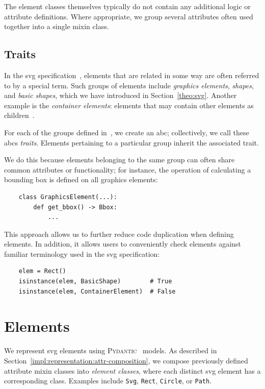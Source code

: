 The element classes themselves typically do not contain any additional logic or attribute definitions. Where appropriate, we group several attributes often used together into a single mixin class.

\subsection{Traits}

In the \gls{svg} specification~\cite{svg11}, elements that are related in some way are often referred to by a special term. Such groups of elements include \emph{graphics elements}, \emph{shapes}, and \emph{basic shapes}, which we have introduced in Section~\ref{theo:svg}. Another example is the \emph{container elements}: elements that may contain other elements as children~\cite[Sec.~1.6]{svg11}. 

For each of the groups defined in~\cite[Sec.~1.6]{svg11}, we create an \gls{abc}; collectively, we call these \glspl{abc} \emph{traits}. Elements pertaining to a particular group inherit the associated trait.

\begin{samepage}
We do this because elements belonging to the same group can often share common attributes or functionality; for instance, the operation of calculating a bounding box is defined on all graphics elements:
\begin{verbatim}
    class GraphicsElement(...):
        def get_bbox() -> Bbox:
            ...
\end{verbatim}
\end{samepage}

\begin{samepage}
This approach allows us to further reduce code duplication when defining elements. In addition, it allows users to conveniently check elements against familiar terminology used in the \gls{svg} specification:
\begin{verbatim}
    elem = Rect()
    isinstance(elem, BasicShape)        # True
    isinstance(elem, ContainerElement)  # False
\end{verbatim}
\end{samepage}

\section{Elements}

We represent \gls{svg} elements using \textsc{Pydantic}~\cite{pydantic} models. As described in Section~\ref{impl:representation:attr-composition}, we compose previously defined attribute mixin classes into \emph{element classes}, where each distinct \gls{svg} element has a corresponding class. Examples include \texttt{Svg}, \texttt{Rect}, \texttt{Circle}, or \texttt{Path}. 


